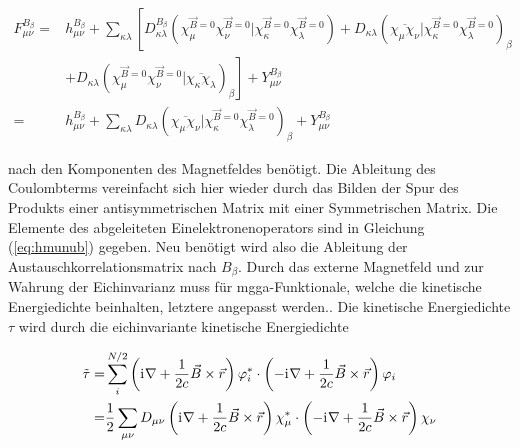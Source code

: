     \begin{equation}\label{eq:fmunudbdft}
    \begin{aligned}
    F_{\mu\nu}^{B_\beta}=&h_{\mu\nu}^{B_\beta}+\sum_{\kappa\lambda}\left[D_{\kappa\lambda}^{B_\beta}\left(\chi_\mu^{\vec{B}=0}\chi_\nu^{\vec{B}=0}\vert\chi_\kappa^{\vec{B}=0}\chi_\lambda^{\vec{B}=0}\right)+D_{\kappa\lambda}\left(\overline{\chi_\mu\chi_\nu}\vert\chi_\kappa^{\vec{B}=0}\chi_\lambda^{\vec{B}=0}\right)_{\beta}\right.\\
    &+\left.D_{\kappa\lambda}\left(\chi_\mu^{\vec{B}=0}\chi_\nu^{\vec{B}=0}\vert\overline{\chi_\kappa\chi_\lambda}\right)_{\beta}\right]+Y_{\mu\nu}^{B_\beta}\\
    =&h_{\mu\nu}^{B_\beta}+\sum_{\kappa\lambda}D_{\kappa\lambda}\left(\overline{\chi_\mu\chi_\nu}\vert\chi_\kappa^{\vec{B}=0}\chi_\lambda^{\vec{B}=0}\right)_{\beta}+Y_{\mu\nu}^{B_\beta}
    \end{aligned}
    \end{equation}

nach den Komponenten des Magnetfeldes benötigt. Die Ableitung des Coulombterms vereinfacht sich hier wieder durch das Bilden der Spur des Produkts einer antisymmetrischen Matrix mit einer Symmetrischen Matrix. Die Elemente des abgeleiteten Einelektronenoperators sind in Gleichung (\ref{eq:hmunub}) gegeben. Neu benötigt wird also die Ableitung der Austauschkorrelationsmatrix nach $B_\beta$. Durch das externe Magnetfeld und zur Wahrung der Eichinvarianz muss für \ac{mgga}-Funktionale, welche die kinetische Energiedichte beinhalten, letztere angepasst werden.\supercite{maximoff2004nuclear}. Die kinetische Energiedichte $\tau$ wird durch die eichinvariante kinetische Energiedichte 

\begin{equation}
\begin{aligned}
\tilde{\tau}=&\sum_i^{N/2}\left(\mathrm{i}\mkern1mu\nabla +\frac{1}{2c}\vec{B}\times\vec{r}\right)\varphi_i^*\cdot\left(-\mathrm{i}\mkern1mu\nabla+\frac{1}{2c}\vec{B}\times\vec{r}\right)\varphi_i\\
=&\frac{1}{2}\sum_{\mu\nu}D_{\mu\nu}\left(\mathrm{i}\mkern1mu\nabla +\frac{1}{2c}\vec{B}\times\vec{r}\right)\chi_\mu^*\cdot\left(-\mathrm{i}\mkern1mu\nabla+\frac{1}{2c}\vec{B}\times\vec{r}\right)\chi_\nu
\end{aligned}
\end{equation}

